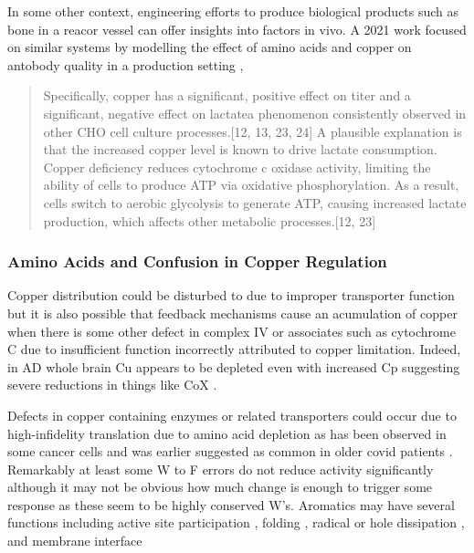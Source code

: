 {
In some other context, engineering efforts to produce
biological products such as bone in a reacor vessel
can offer insights into factors in vivo.
A 2021 work focused on similar systems by modelling the
effect of amino acids and copper on antobody quality in 
a production setting 
\cite{PMID32875683},
\begin{quote}
{Specifically, copper has a significant, positive effect on titer and a
significant, negative effect on lactatea phenomenon consistently observed
in other CHO cell culture processes.{[}12, 13, 23, 24{]} A plausible explanation
is that the increased copper level is known to drive lactate consumption.
Copper deficiency reduces cytochrome c oxidase activity, limiting the ability
of cells to produce ATP via oxidative phosphorylation. As a result, cells
switch to aerobic glycolysis to generate ATP, causing increased lactate
production, which affects other metabolic processes.{[}12, 23{]}}
\end{quote}

\subsubsection{ Amino Acids and Confusion in Copper Regulation } 

Copper distribution could be disturbed to due to improper
transporter function but 
it is also possible that feedback mechanisms cause
an acumulation of copper when there is some other defect in
complex IV or associates such as  cytochrome C 
due to insufficient function incorrectly attributed to copper limitation. 
Indeed, in AD whole brain Cu appears to be depleted even with
increased Cp suggesting severe reductions in things like 
CoX
\cite{Cooper_Xu_Church_Evidence_widespread_severe_2017}.

Defects in copper containing enzymes or related transporters
could occur due to
high-infidelity translation due to amino acid depletion
as has been observed in some cancer cells \cite{PMID39755122}
and was earlier suggested as common in older covid
patients \cite{mmarchywka-MJM-2020-002-0.10}.
Remarkably at least some W to F errors do not reduce activity
significantly \cite{Overholtzer_Yakowec_Cameron_Effect_Amino_1996}
although it may not be obvious how much change is enough to
trigger some response as these seem to be highly conserved W's.
Aromatics may have several functions including active
site participation
\cite{Blomberg_Mechanism_Oxygen_Reduction_2016}
, folding
\cite{PMC1222194}
, radical 
\cite{LemmaGray_Weintraub_Carroll_Tryptophan_oxidation_2007}
or hole 
\cite{Gray_Winkler_Hole_hopping_through_tyrosine_2015}
dissipation
, and membrane
interface
\cite{Khemaissa_Walrant_Sagan_Tryptophan_more_than_just_2022}

}
